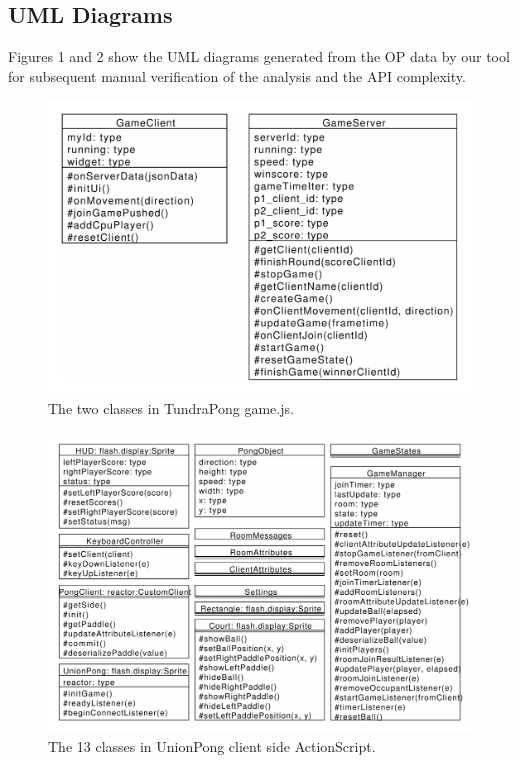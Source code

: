 \documentclass[conference]{IEEEtran}
\begin{document}
\subsection{UML Diagrams%
  \label{uml-diagrams}%
}

Figures 1 and 2 show the UML diagrams generated from the OP data by
our tool for subsequent manual verification of the analysis and the
API complexity.
\begin{figure}
\includegraphics[scale=0.400000]{pics/TundraPong_fontembed.pdf}
\caption{The two classes in TundraPong game.js.}
\end{figure}
\begin{figure}
\includegraphics[scale=0.350000]{pics/UnionPong-manuallayout_fontembed.pdf}
\caption{The 13 classes in UnionPong client side ActionScript.}
\end{figure}
\end{document}
